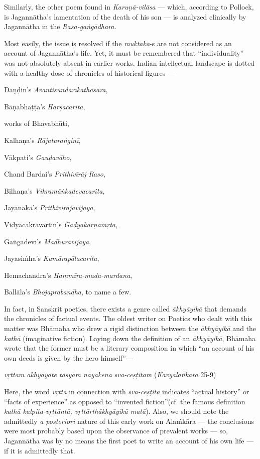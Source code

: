 Similarly, the other poem found in {\sl Karuṇā-vilāsa} — which, according to Pollock, is Jagannātha’s lamentation of the death of his son — is analyzed clinically by Jagannātha in the {\sl Rasa-gaṅgādhara.}

Most easily, the issue is resolved if the {\sl muktaka}-s are not considered as an account of Jagannātha’s life. Yet, it must be remembered that “individuality” was not absolutely absent in earlier works. Indian intellectual landscape is dotted with a healthy dose of chronicles of historical figures — 

Daṇḍin’s {\sl Avantisundarīkathāsāra}, 

Bāṇabhaṭṭa’s {\sl Harṣacarita},

works of Bhavabhūti, 

Kalhaṇa’s {\sl Rājataraṅginī}, 

Vākpati’s {\sl Gauḍavāho}, 

Chand Bardai’s {\sl Prithivīrāj Raso}, 

Bilhaṇa’s {\sl Vikramāṅkadevacarita}, 

Jayānaka’s {\sl Prithivirājavijaya}, 

Vidyācakravartin’s {\sl Gadyakarṇāmṛta}, 

Gaṅgā\-devī’s {\sl Madhurāvijaya}, 

Jayasiṁha’s {\sl Kumārapālacarita}, 

Hemachandra’s {\sl Hammīra-mada-mardana}, 

Ballāla’s {\sl Bhojaprabandha},  to name a few. 

In fact, in Sanskrit poetics, there exists a genre called {\sl ākhyāyikā} that demands the chronicles of factual events. The oldest writer on Poetics who dealt with this matter was Bhāmaha who drew a rigid distinction between the {\sl ākhyāyikā} and the {\sl kathā} (imaginative fiction). Laying down the definition of an {\sl ākhyāyikā}, Bhāmaha wrote that the former must be a literary composition in which “an account of his own deeds is given by the hero himself”— 

{\sl vṛttam ākhyāyate tasyām nāyakena sva-ceṣṭitam} 	          \hfill{({\sl Kāvyālaṅkara} 25-9)}

Here, the word {\sl vṛtta} in connection with {\sl sva-ceṣṭita} indicates “actual history” or “facts of experience” as opposed to “invented fiction”(cf. the famous definition {\sl kathā kalpita-vṛttāntā, vṛttārthākhyāyikā matā}). Also, we should note the admittedly {\sl a posteriori} nature of this early work on Alaṁkāra — the conclusions were most probably based upon the observance of prevalent works — so, Jagannātha was by no means the first poet to write an account of his own life — if it is admittedly that.  

